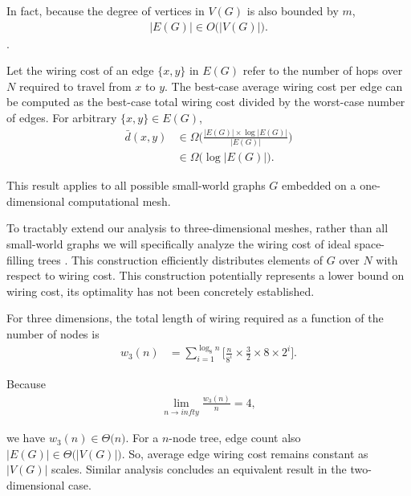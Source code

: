 In fact, because the degree of vertices in $V(G)$ is also bounded by $m$,
\begin{align*}
|E(G)| \in O \Big( |V(G)| \Big).
\end{align*}.

Let the wiring cost of an edge $\{x, y\}$ in $E(G)$ refer to the number of hops over $N$ required to travel from $x$ to $y$.
The best-case average wiring cost per edge can be computed as the best-case total wiring cost divided by the worst-case number of edges.
For arbitrary $\{x, y\} \in E(G)$,
\begin{align*}
\bar{d}(x, y)
&\in \Omega \Big( \frac{ |E(G)| \times \log |E(G)| }{ |E(G)| } \Big)\\
&\in \Omega \Big( \log |E(G)| \Big).
\end{align*}

This result applies to all possible small-world graphs $G$ embedded on a one-dimensional computational mesh.

To tractably extend our analysis to three-dimensional meshes, rather than all small-world graphs we will specifically analyze the wiring cost of ideal space-filling trees \citep{kuffner2009space}.
This construction efficiently distributes elements of $G$ over $N$ with respect to wiring cost.
This construction potentially represents a lower bound on wiring cost, its optimality has not been concretely established.

For three dimensions, the total length of wiring required as a function of the number of nodes is
\begin{align*}
w_3(n)
&=
\sum_{i=1}^{\log_8 n} \Big[
  \frac{n}{8^i} %
  \times
  \frac{3}{2} \times 8 \times 2^{i} %
\Big].
\end{align*}

Because
\begin{align*}
\lim_{n \rightarrow infty}
\frac{w_3(n)}{n} = 4,
\end{align*}

we have $w_3(n) \in \Theta \Big( n \Big)$.
For a $n$-node tree, edge count also $|E(G)| \in \Theta \Big( |V(G)| \Big)$.
So, average edge wiring cost remains constant as $|V(G)|$ scales.
Similar analysis concludes an equivalent result in the two-dimensional case.





